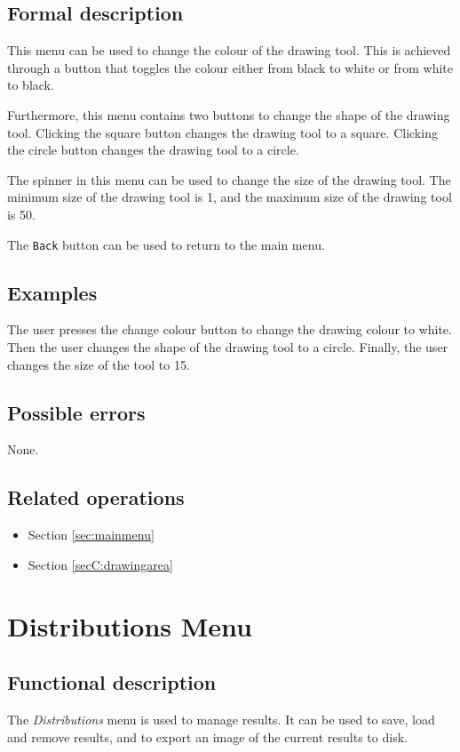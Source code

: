   \subsection*{Formal description}
  This menu can be used to change the colour of the drawing tool. This is achieved through a button that toggles the colour either from black to white or from white to black.
  
  Furthermore, this menu contains two buttons to change the shape of the drawing tool. Clicking the square button changes the drawing tool to a square. Clicking the circle button changes the drawing tool to a circle.
  
  The spinner in this menu can be used to change the size of the drawing tool. The minimum size of the drawing tool is 1, and the maximum size of the drawing tool is 50.
  
  The \texttt{Back} button can be used to return to the main menu.

  \subsection*{Examples}
  The user presses the change colour button to change the drawing colour to white. Then the user changes the shape of the drawing tool to a circle. Finally, the user changes the size of the tool to 15.

  \subsection*{Possible errors}
  None.

  \subsection*{Related operations}
  \begin{itemize}
    \item Section \ref{sec:mainmenu}
    \item Section \ref{secC:drawingarea}
  \end{itemize}

\section{Distributions Menu}\label{sec:distmenu}
  \subsection*{Functional description}
  The \emph{Distributions} menu is used to manage results. It can be used to save, load and remove results, and to export an image of the current results to disk.

